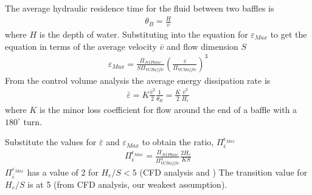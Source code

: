 \documentclass[letterpaper,10pt,english]{sphinxmanual}
\begin{document}
The average hydraulic residence time for the fluid between two baffles
is
\begin{equation}\label{equation:Rapid_Mix/RM_Derivations:Rapid_Mix/RM_Derivations:127}
\begin{split}\theta_B = \frac{H}{\bar v}\end{split}
\end{equation}
where \(H\) is the depth of water. Substituting into the equation for \(\varepsilon_{Max}\) to get the equation in terms of the average velocity \(\bar v\) and flow dimension \(S\)
\begin{equation}\label{equation:Rapid_Mix/RM_Derivations:Rapid_Mix/RM_Derivations:128}
\begin{split}\varepsilon_{Max}= \frac{\Pi_{JetPlane}}{S \Pi_{VCBaffle}} \left( \frac{ \bar v}{\Pi_{VCBaffle}} \right)^3\end{split}
\end{equation}
From the control volume analysis the average energy dissipation rate is
\begin{equation}\label{equation:Rapid_Mix/RM_Derivations:Rapid_Mix/RM_Derivations:129}
\begin{split}\bar \varepsilon = K \frac{\bar v^2}{2} \frac{1}{\theta_B} = \frac{K}{2} \frac{\bar v^3}{H_e}\end{split}
\end{equation}
where \(K\) is the minor loss coefficient for flow around the end of a baffle with a \(180^\circ\) turn.

Substitute the values for \(\bar \varepsilon\) and
\(\varepsilon_{Max}\) to obtain the ratio,
\(\Pi_{\bar \epsilon}^{\epsilon_{Max}}\)
\begin{equation}\label{equation:Rapid_Mix/RM_Derivations:Rapid_Mix/RM_Derivations:130}
\begin{split}\Pi_{\bar \epsilon}^{\epsilon_{Max}} = \frac{\Pi_{JetPlane}}{\Pi_{VCBaffle}^4} \frac{2 H_e}{K S}\end{split}
\end{equation}
\(\Pi_{\bar \varepsilon}^{\varepsilon_{Max}}\) has a value of 2 for
\(H_e/S <5\) (CFD analysis and )
The transition value for \(H_e/S\) is at 5 (from CFD analysis, our weakest assumption).
\end{document}
